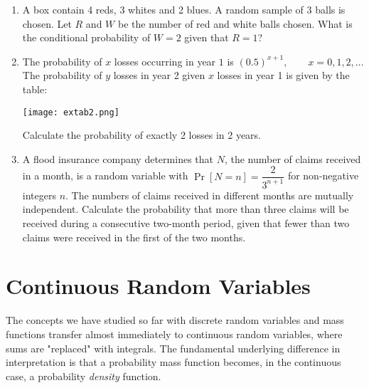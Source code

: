 \documentclass[../main.tex]{subfiles}
\begin{document}
\begin{exercises}
\begin{enumerate}
	\item %
	A box contain 4 reds, 3 whites and 2 blues. A random sample of 3 balls is
	chosen. Let $R$ and $W$ be the number of red and white balls chosen. What is
	the conditional probability of $W = 2$ given that $R = 1$?
	
	\item %
	The probability of $x$ losses occurring in year $1$ is 
	$(0.5)^{x+1} , \qquad x = 0, 1, 2,\ldots$
	The probability of $y$ losses in year 2 given $x$ losses in year 1 is given by the table:
	\begin{center}
	\texttt{[image: extab2.png]}
	\end{center}	
	Calculate the probability of exactly 2 losses in 2 years.
	
	\item %
	A flood insurance company determines that $N$, the number of claims received
	in a month, is a random variable with $\Pr[N=n] = \dfrac{2}{3^{n+1}}$ 
	for non-negative integers $n$.
	The numbers of claims received in different months are mutually independent. Calculate the probability that more than three claims will be received
	during a consecutive two-month period, given that fewer than two claims
	were received in the first of the two months.
	
\end{enumerate}
\end{exercises}

\section{Continuous Random Variables}
The concepts we have studied so far with discrete random variables and mass functions transfer
almost immediately to continuous random variables, where sums are "replaced" with integrals. The fundamental underlying difference in interpretation is that a probability mass function becomes, in the continuous case, a probability \textit{density} function.
\end{document}
